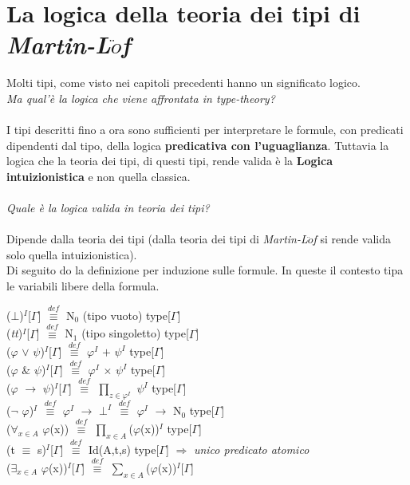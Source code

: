 \chapter{La logica della teoria dei tipi di \textit{Martin-L$\ddot{o}$f}}
\label{cap:la-logica-della-teoria-dei-tipi-di-Martin-Lof}
Molti tipi, come visto nei capitoli precedenti hanno un significato logico.\\\textit{Ma qual'\`e la logica che viene affrontata in \textit{type-theory}?}\\\\
\noindent I tipi descritti fino a ora sono sufficienti per interpretare le formule, con predicati dipendenti dal tipo, della logica \textbf{predicativa con l'uguaglianza}. Tuttavia la logica che la teoria dei tipi, di questi tipi, rende valida \`e la \textbf{Logica intuizionistica} e non quella classica.\\\\
\noindent
\textit{Quale \`e la logica valida in teoria dei tipi?}\\\\
\noindent Dipende dalla teoria dei tipi (dalla teoria dei tipi di \textit{Martin-L$\ddot{o}$f} si rende valida solo quella intuizionistica).\\
Di seguito do la definizione per induzione sulle formule. In queste il contesto tipa le variabili libere della formula.
\begin{center}
($\bot$)$^I$[$\Gamma$] ${\overset{\mathit{def}}{\equiv}}$ N$_0$ (tipo vuoto) type[$\Gamma$]\\
(\textit{tt})$^I$[$\Gamma$] ${\overset{\mathit{def}}{\equiv}}$ N$_1$ (tipo singoletto) type[$\Gamma$]\\
($\varphi$ $\vee$ $\psi$)$^I$[$\Gamma$] ${\overset{\mathit{def}}{\equiv}}$ $\varphi^I$ $+$ $\psi^I$ type[$\Gamma$]\\
($\varphi$ $\&$ $\psi$)$^I$[$\Gamma$] ${\overset{\mathit{def}}{\equiv}}$ $\varphi^I$ $\times$ $\psi^I$ type[$\Gamma$]\\
($\varphi$ $\rightarrow$ $\psi$)$^I$[$\Gamma$] ${\overset{\mathit{def}}{\equiv}}$ $\prod_{z \in \varphi^I}$ $\psi^I$ type[$\Gamma$]\\
($\neg$ $\varphi$)$^I$ ${\overset{\mathit{def}}{\equiv}}$ $\varphi^I$ $\rightarrow$ $\bot^I$ ${\overset{\mathit{def}}{\equiv}}$ $\varphi^I$ $\rightarrow$ N$_0$ type[$\Gamma$]\\
($\forall_{x \in A}$ $\varphi$(x)) ${\overset{\mathit{def}}{\equiv}}$ $\prod\limits_{x \in A}$($\varphi$(x))$^I$ type[$\Gamma$]\\
(t $\equiv$ s)$^I$[$\Gamma$] ${\overset{\mathit{def}}{\equiv}}$ Id(A,t,s) type[$\Gamma$] $\Rightarrow$ \textit{unico predicato atomico}\\
($\exists_{x \in A}$ $\varphi$(x))$^I$[$\Gamma$] ${\overset{\mathit{def}}{\equiv}}$ $\sum\limits_{x \in A}$($\varphi$(x))$^I$[$\Gamma$]
\end{center}
